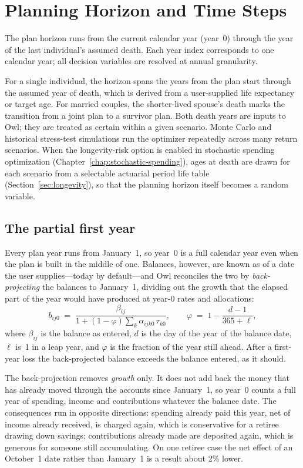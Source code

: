 \documentclass[fleqn,12pt]{report}
\begin{document}
\section{Planning Horizon and Time Steps}

The plan horizon runs from the current calendar year (year~0) through the
year of the last individual's assumed death.
Each year index corresponds to one calendar year; all decision variables
are resolved at annual granularity.

For a single individual, the horizon spans the years from the plan start
through the assumed year of death, which is derived from a user-supplied
life expectancy or target age.
For married couples, the shorter-lived spouse's death marks the transition
from a joint plan to a survivor plan.
Both death years are inputs to Owl; they are treated as certain within a
given scenario.
Monte Carlo and historical stress-test simulations run the optimizer
repeatedly across many return scenarios.
When the longevity-risk option is enabled in stochastic spending
optimization (Chapter~\ref{chap:stochastic-spending}), ages at death are drawn for each scenario from a
selectable actuarial period life table (Section~\ref{sec:longevity}), so that
the planning horizon itself becomes a random variable.

\subsection*{The partial first year}

Every plan year runs from January~1, so year~0 is a full calendar year even
when the plan is built in the middle of one.
Balances, however, are known as of a date the user supplies---today by
default---and Owl reconciles the two by \emph{back-projecting} the balances to
January~1, dividing out the growth that the elapsed part of the year would have
produced at year-0 rates and allocations:
\begin{equation}
    \label{Eq:BackProject}
    b_{ij0} \;=\;
    \frac{\beta_{ij}}
         {1 + (1 - \varphi)\sum_k \alpha_{ijk0}\,\tau_{k0}},
    \qquad
    \varphi \;=\; 1 - \frac{d - 1}{365 + \ell},
\end{equation}
where $\beta_{ij}$ is the balance as entered, $d$ is the day of the year of the
balance date, $\ell$ is~1 in a leap year, and $\varphi$ is the fraction of the
year still ahead.
After a first-year loss the back-projected balance exceeds the balance entered,
as it should.

The back-projection removes \emph{growth} only.
It does not add back the money that has already moved through the accounts since
January~1, so year~0 counts a full year of spending, income and contributions
whatever the balance date.
The consequences run in opposite directions: spending already paid this year,
net of income already received, is charged again, which is conservative for a
retiree drawing down savings; contributions already made are deposited again,
which is generous for someone still accumulating.
On one retiree case the net effect of an October~1 date rather than January~1 is
a result about 2\% lower.
\end{document}
